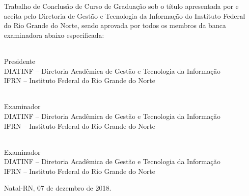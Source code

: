\begin{folhadeaprovacao}
	\setlength{\ABNTsignthickness}{0.4pt}
	\setlength{\ABNTsignwidth}{10cm}
	
	\noindent 
	Trabalho de Conclusão de Curso de Graduação sob o título
	\textit{\thesistitle} apresentada por \thesisauthor e aceita pelo Diretoria
	de Gestão e Tecnologia da Informação do Instituto Federal do Rio Grande do
	Norte, sendo aprovada por todos os membros da banca examinadora abaixo especificada:
		
	\assinatura
	{
		\thesissupervisor   			                  \\
		{\small Presidente}											          \smallskip\\ 
		{\footnotesize
			DIATINF -- Diretoria Acadêmica de Gestão e Tecnologia da Informação		   \\
		  	IFRN -- Instituto Federal do Rio Grande do Norte
		}
   }
      
   \assinatura
	{
		\thesisdefencecommitteemembershipone   			                  \\
		{\small Examinador}											          \smallskip\\ 
		{\footnotesize
			DIATINF -- Diretoria Acadêmica de Gestão e Tecnologia da Informação		   \\
			IFRN -- Instituto Federal do Rio Grande do Norte
		}
   }   
   
   \assinatura
	{
		\thesisdefencecommitteemembershiptwo   			                  \\
		{\small Examinador}											          \smallskip\\ 
		{\footnotesize
			DIATINF -- Diretoria Acadêmica de Gestão e Tecnologia da Informação		   \\
			IFRN -- Instituto Federal do Rio Grande do Norte
		}
	}
		
	\vfill
	
	\begin{center}
		Natal-RN, 07 de dezembro de 2018.
	\end{center}
\end{folhadeaprovacao}
